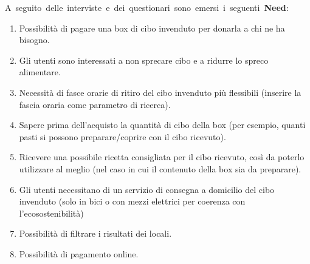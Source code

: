 \documentclass{article}
\begin{document}
\hbox{A seguito delle interviste e dei questionari sono emersi i seguenti \textbf{Need}:}
\begin{enumerate}[label=\textbf{Need-\arabic*}]
    \item Possibilità di pagare una box di cibo invenduto per donarla a chi ne ha bisogno. \label{need1}
    \item Gli utenti sono interessati a non sprecare cibo e a ridurre lo spreco alimentare. \label{need2}
    \item Necessità di fasce orarie di ritiro del cibo invenduto più flessibili (inserire la fascia oraria come parametro di ricerca). \label{need3}
    \item Sapere prima dell'acquisto la quantità di cibo della box (per esempio, quanti pasti si possono preparare/coprire con il cibo ricevuto). \label{need4}
    \item Ricevere una possibile ricetta consigliata per il cibo ricevuto, così da poterlo utilizzare al meglio (nel caso in cui il contenuto della box sia da preparare). \label{need5}
    \item Gli utenti necessitano di un servizio di consegna a domicilio del cibo invenduto (solo in bici o con mezzi elettrici per coerenza con l'ecosostenibilità) \label{need6}
    \item Possibilità di filtrare i risultati dei locali. \label{need7}
    \item Possibilità di pagamento online. \label{need8}
\end{enumerate}



\newpage
\end{document}
